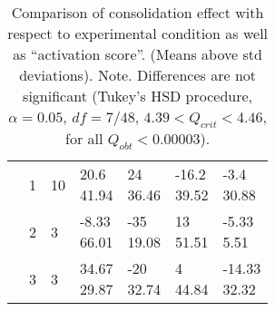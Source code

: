 \begin{table*}
\begin{tabularx}{\textwidth}{XXXXXXX}
      & 1
      & 10
      & \cellcontent{20.6\\41.94}
      & \cellcontent{24\\36.46}
      & \cellcontent{-16.2\\39.52}
      & \cellcontent{-3.4\\30.88}
      \\

      & 2
      & 3
      & \cellcontent{-8.33\\66.01}
      & \cellcontent{-35\\19.08}
      & \cellcontent{13\\51.51}
      & \cellcontent{-5.33\\5.51}
      \\

      & 3
      & 3
      & \cellcontent{34.67\\29.87}
      & \cellcontent{-20\\32.74}
      & \cellcontent{4\\44.84}
      & \cellcontent{-14.33\\32.32}
      \\

      \bottomrule
    \end{tabularx}
    \endgroup
  \caption{Comparison of consolidation effect with respect to
    experimental condition as well as ``activation score''. (Means
    above std deviations). Note. Differences are not significant
    (Tukey's HSD procedure, $\alpha=0.05$, $df = 7/48$,  $4.39 <
    Q_{crit} < 4.46$, for all $Q_{obt}<0.00003$).\label{tab:activation}}
\end{table*}



